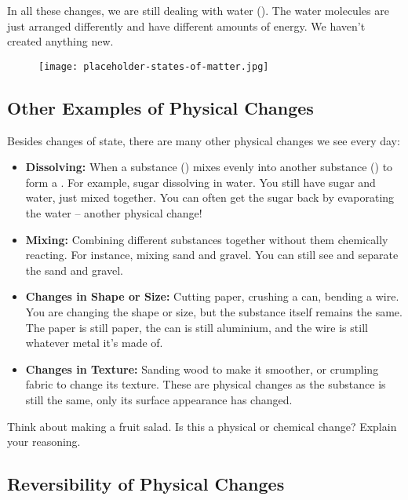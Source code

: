 In all these changes, we are still dealing with water (). The water molecules are just arranged differently and have different amounts of energy.  We haven't created anything new.

\begin{figure}
\centering
\texttt{[image: placeholder-states-of-matter.jpg]}
\end{figure}

\subsection{Other Examples of Physical Changes}

Besides changes of state, there are many other physical changes we see every day:

\begin{itemize}
    \item \textbf{Dissolving:} When a substance () mixes evenly into another substance () to form a . For example, sugar dissolving in water. You still have sugar and water, just mixed together. You can often get the sugar back by evaporating the water – another physical change!
    \item \textbf{Mixing:}  Combining different substances together without them chemically reacting. For instance, mixing sand and gravel. You can still see and separate the sand and gravel.
    \item \textbf{Changes in Shape or Size:}  Cutting paper, crushing a can, bending a wire. You are changing the shape or size, but the substance itself remains the same.  The paper is still paper, the can is still aluminium, and the wire is still whatever metal it's made of.
    \item \textbf{Changes in Texture:}  Sanding wood to make it smoother, or crumpling fabric to change its texture. These are physical changes as the substance is still the same, only its surface appearance has changed.
\end{itemize}

\begin{stopandthink}
Think about making a fruit salad. Is this a physical or chemical change? Explain your reasoning.
\end{stopandthink}

\subsection{Reversibility of Physical Changes}


